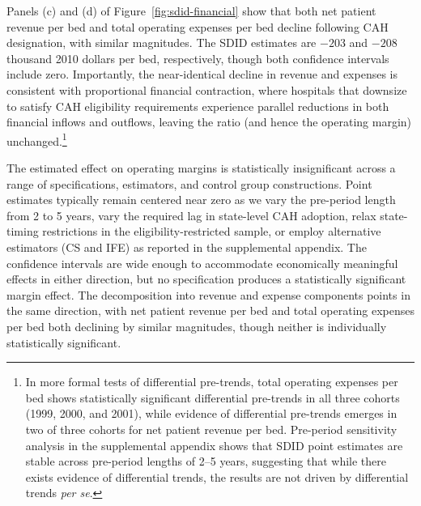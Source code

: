\documentclass[a4paper, 12pt, twoside]{article}
\begin{document}
Panels (c) and (d) of Figure~\ref{fig:sdid-financial} show that both net patient revenue per bed and total operating expenses per bed decline following CAH designation, with similar magnitudes. The SDID estimates are $-203$ and $-208$ thousand 2010 dollars per bed, respectively, though both confidence intervals include zero. Importantly, the near-identical decline in revenue and expenses is consistent with proportional financial contraction, where hospitals that downsize to satisfy CAH eligibility requirements experience parallel reductions in both financial inflows and outflows, leaving the ratio (and hence the operating margin) unchanged.\footnote{In more formal tests of differential pre-trends, total operating expenses per bed shows statistically significant differential pre-trends in all three cohorts (1999, 2000, and 2001), while evidence of differential pre-trends emerges in two of three cohorts for net patient revenue per bed. Pre-period sensitivity analysis in the supplemental appendix shows that SDID point estimates are stable across pre-period lengths of 2--5 years, suggesting that while there exists evidence of differential trends, the results are not driven by differential trends \textit{per se}.}

The estimated effect on operating margins is statistically insignificant across a range of specifications, estimators, and control group constructions. Point estimates typically remain centered near zero as we vary the pre-period length from 2 to 5 years, vary the required lag in state-level CAH adoption, relax state-timing restrictions in the eligibility-restricted sample, or employ alternative estimators (CS and IFE) as reported in the supplemental appendix. The confidence intervals are wide enough to accommodate economically meaningful effects in either direction, but no specification produces a statistically significant margin effect. The decomposition into revenue and expense components points in the same direction, with net patient revenue per bed and total operating expenses per bed both declining by similar magnitudes, though neither is individually statistically significant.
\end{document}
